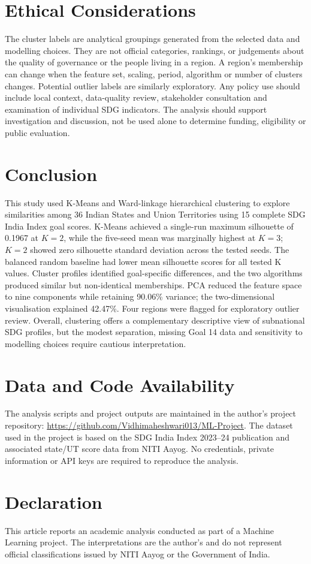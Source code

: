 \documentclass[11pt,a4paper]{article}
\begin{document}
\section{Ethical Considerations}
The cluster labels are analytical groupings generated from the selected data and modelling choices. They are not official categories, rankings, or judgements about the quality of governance or the people living in a region. A region's membership can change when the feature set, scaling, period, algorithm or number of clusters changes. Potential outlier labels are similarly exploratory. Any policy use should include local context, data-quality review, stakeholder consultation and examination of individual SDG indicators. The analysis should support investigation and discussion, not be used alone to determine funding, eligibility or public evaluation.

\section{Conclusion}
This study used K-Means and Ward-linkage hierarchical clustering to explore similarities among 36 Indian States and Union Territories using 15 complete SDG India Index goal scores. K-Means achieved a single-run maximum silhouette of 0.1967 at $K=2$, while the five-seed mean was marginally highest at $K=3$; $K=2$ showed zero silhouette standard deviation across the tested seeds. The balanced random baseline had lower mean silhouette scores for all tested K values. Cluster profiles identified goal-specific differences, and the two algorithms produced similar but non-identical memberships. PCA reduced the feature space to nine components while retaining 90.06\% variance; the two-dimensional visualisation explained 42.47\%. Four regions were flagged for exploratory outlier review. Overall, clustering offers a complementary descriptive view of subnational SDG profiles, but the modest separation, missing Goal 14 data and sensitivity to modelling choices require cautious interpretation.

\section*{Data and Code Availability}
The analysis scripts and project outputs are maintained in the author's project repository:
\url{https://github.com/Vidhimaheshwari013/ML-Project}.
The dataset used in the project is based on the SDG India Index 2023--24 publication and associated state/UT score data from NITI Aayog. No credentials, private information or API keys are required to reproduce the analysis.

\section*{Declaration}
This article reports an academic analysis conducted as part of a Machine Learning project. The interpretations are the author's and do not represent official classifications issued by NITI Aayog or the Government of India.



\end{document}
